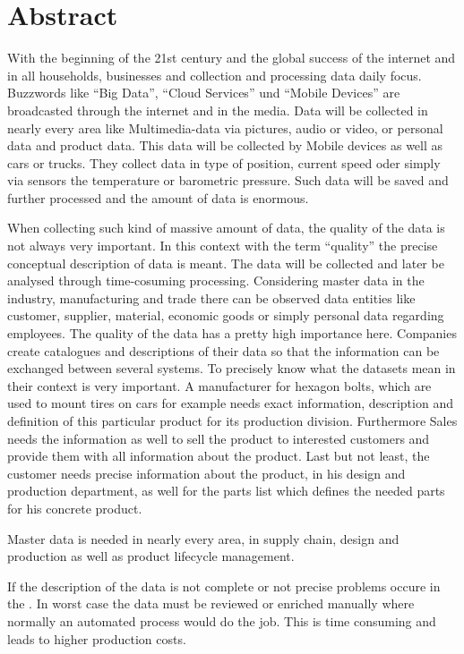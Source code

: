 \chapter*{Abstract}


With the beginning of the 21st century and the global success of the internet and in all households, businesses and collection and processing data daily focus. Buzzwords like \enquote{Big Data}, \enquote{Cloud Services} und \enquote{Mobile Devices} are broadcasted through the internet and in the media. Data will be collected in nearly every area like Multimedia-data via pictures, audio or video, or personal data and product data. This data will be collected by Mobile devices as well as cars or trucks. They collect data in type of position, current speed oder simply via sensors the temperature or barometric pressure. Such data will be saved and further processed and the amount of data is enormous. 

When collecting such kind of massive amount of data, the quality of the data is not always very important. In this context with the term \enquote{quality} the precise conceptual description of data is meant. The data will be collected and later be analysed through time-cosuming processing. 
Considering master data in the industry, manufacturing and trade there can be observed data entities like customer, supplier, material, economic goods or simply personal data regarding employees. The quality of the data has a pretty high importance here. Companies create catalogues and descriptions of their data so that the information can be exchanged between several systems. To precisely know what the datasets mean in their context is very important. A manufacturer for hexagon bolts, which are used to mount tires on cars for example needs exact information, description and definition of this particular product for its production division. Furthermore Sales needs the information as well to sell the product to interested customers and provide them with all information about the product. Last but not least, the customer needs precise information about the product, in his design and production department, as well for the parts list which defines the needed parts for his concrete product. 

Master data is needed in nearly every area, in supply chain, design and production as well as product lifecycle management. 

If the description of the data is not complete or not precise problems occure in the . In worst case the data must be reviewed or enriched manually where normally an automated process would do the job. This is time consuming and leads to higher production costs.   

